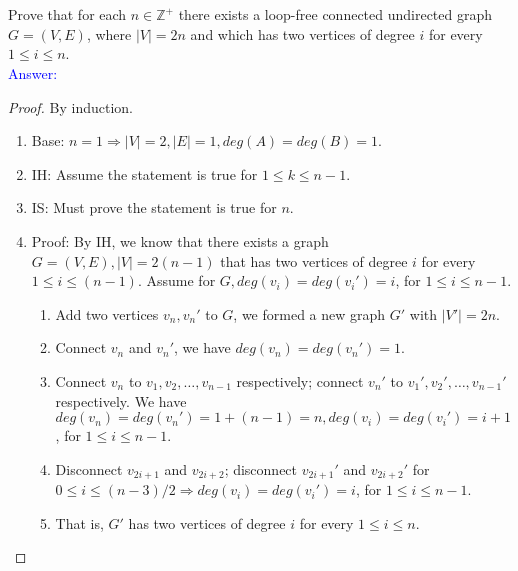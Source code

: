 \documentclass[a4paper]{article}
\begin{document}
\section{}
Prove that for each $n\in\mathbb{Z^+}$ there exists a loop-free connected undirected graph $G=(V,E)$, where $|V|=2n$ and which has two vertices of degree $i$ for every $1\leq i\leq n$.\\
    \textcolor{blue}{Answer:}
    \begin{proof} By induction.
        \begin{enumerate}
            \item Base: $n=1\Rightarrow |V|=2, |E|=1, deg(A)=deg(B)=1$.\\
            \item IH: Assume the statement is true for $1\leq k\leq n-1$.
            \item IS: Must prove the statement is true for $n$.
            \item Proof: By IH, we know that there exists a graph $G=(V,E), |V|=2(n-1)$ that has two vertices of degree $i$ for every $1\leq i\leq (n-1)$. Assume for $G, deg(v_i)=deg(v_i')=i$, for $1\leq i\leq n-1$.
                \begin{enumerate}
                    \item Add two vertices $v_n, v_n'$ to $G$, we formed a new graph $G'$ with $|V'|=2n$.
                    \item Connect $v_n$ and $v_n'$, we have $deg(v_n)=deg(v_n')=1$.
                    \item Connect $v_n$ to $v_1,v_2,\ldots, v_{n-1}$ respectively; connect $v_n'$ to $v_1',v_2',\ldots, v_{n-1}'$ respectively. We have $deg(v_n)=deg(v_n')=1+(n-1)=n, deg(v_i)=deg(v_i')=i+1$, for $1\leq i\leq n-1$.
                    \item Disconnect $v_{2i+1}$ and $v_{2i+2}$; disconnect $v_{2i+1}'$ and $v_{2i+2}'$ for $0\leq i\leq (n-3)/2\Rightarrow deg(v_i)=deg(v_i')=i$, for $1\leq i\leq n-1$.
                    \item That is, $G'$ has two vertices of degree $i$ for every $1\leq i\leq n$.
                \end{enumerate}
        \end{enumerate}
    \end{proof}
\end{document}
